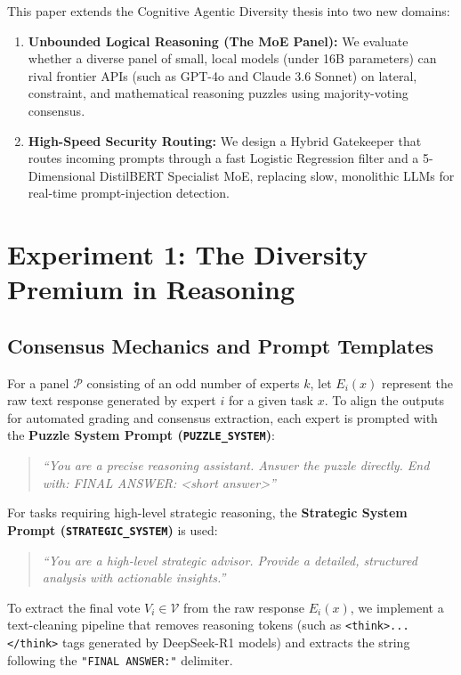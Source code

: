 \documentclass[11pt,a4paper]{article}
\begin{document}
This paper extends the Cognitive Agentic Diversity thesis into two new domains:
\begin{enumerate}
    \item \textbf{Unbounded Logical Reasoning (The MoE Panel):} We evaluate whether a diverse panel of small, local models (under 16B parameters) can rival frontier APIs (such as GPT-4o and Claude 3.6 Sonnet) on lateral, constraint, and mathematical reasoning puzzles using majority-voting consensus.
    \item \textbf{High-Speed Security Routing:} We design a Hybrid Gatekeeper that routes incoming prompts through a fast Logistic Regression filter and a 5-Dimensional DistilBERT Specialist MoE, replacing slow, monolithic LLMs for real-time prompt-injection detection.
\end{enumerate}

\section{Experiment 1: The Diversity Premium in Reasoning}

\subsection{Consensus Mechanics and Prompt Templates}

For a panel $\mathcal{P}$ consisting of an odd number of experts $k$, let $E_i(x)$ represent the raw text response generated by expert $i$ for a given task $x$. To align the outputs for automated grading and consensus extraction, each expert is prompted with the \textbf{Puzzle System Prompt (\texttt{PUZZLE\_SYSTEM})}:
\begin{quote}
\textit{``You are a precise reasoning assistant. Answer the puzzle directly. End with: FINAL ANSWER: <short answer>''}
\end{quote}

For tasks requiring high-level strategic reasoning, the \textbf{Strategic System Prompt (\texttt{STRATEGIC\_SYSTEM})} is used:
\begin{quote}
\textit{``You are a high-level strategic advisor. Provide a detailed, structured analysis with actionable insights.''}
\end{quote}

To extract the final vote $V_i \in \mathcal{V}$ from the raw response $E_i(x)$, we implement a text-cleaning pipeline that removes reasoning tokens (such as \texttt{<think>...</think>} tags generated by DeepSeek-R1 models) and extracts the string following the \texttt{"FINAL ANSWER:"} delimiter.
\end{document}
